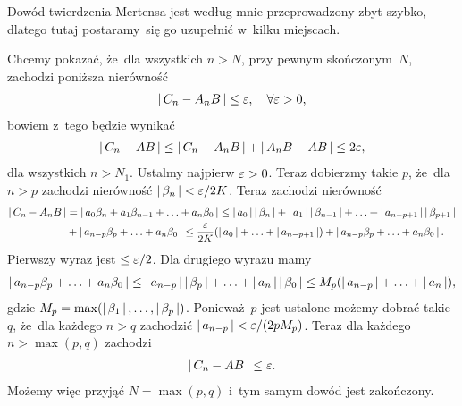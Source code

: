 \documentclass[a4paper,11pt]{article}
\begin{document}
\vspace{\spaceFour}


\start {} Dowód twierdzenia Mertensa jest według mnie
przeprowadzony zbyt szybko, dlatego tutaj postaramy~się go uzupełnić
w~kilku miejscach.

Chcemy pokazać, że~dla wszystkich $n > N$, przy pewnym skończonym~$N$,
zachodzi poniższa nierówność
\begin{equation}
  \label{eq:Leja-9}
  \begin{split}
    \left| \,  C_{ n } - A_{ n } B  \, \right| \leq \varepsilon, \quad \forall \varepsilon > 0,
  \end{split}
\end{equation}
bowiem z~tego będzie wynikać
\begin{equation}
  \label{eq:Leja-10}
  \begin{split}
    \left| \,  C_{ n } - AB  \, \right| \leq \left| \,  C_{ n } - A_{ n } B  \, \right| + \left| \, 
      A_{ n } B - AB  \, \right| \leq 2\varepsilon,
  \end{split}
\end{equation}
dla wszystkich $n > N_{ 1 }$. Ustalmy najpierw $\varepsilon > 0$. Teraz
dobierzmy takie $p$, że~dla $n > p$ zachodzi nierówność
$\left| \,  \beta_{ n }  \, \right| < \varepsilon / 2K$. Teraz zachodzi nierówność
\begin{equation}
  \label{eq:Leja-11}
  \begin{split}
    \left| \,  C_{ n } - A_{ n } B  \, \right| &= \left| \,  a_{ 0 } \beta_{ n } + a_{ 1 }
      \beta_{ n - 1 } + \ldots + a_{ n } \beta_{ 0 }  \, \right| \leq \left| \,  a_{ 0 }  \, \right|
    \left| \,  \beta_{ n }  \, \right| + \left| \,  a_{ 1 }  \, \right| \left| \,  \beta_{ n - 1 }  \, \right| + \ldots
    + \left| \,  a_{ n - p + 1 }  \, \right|
    \left| \,  \beta_{ p + 1 }  \, \right| \\
    &+ \left| \,  a_{ n - p } \beta_{ p } + \ldots + a_{ n } \beta_{ 0 }  \, \right| \leq
    \frac{ \varepsilon }{ 2K } ( \left| \,  a_{ 0 }  \, \right| + \ldots + \left| \,  a_{ n - p + 1
      }  \, \right| ) + \left| \,  a_{ n - p } \beta_{ p } + \ldots + a_{ n } \beta_{ 0 }
     \, \right|.
  \end{split}
\end{equation}
Pierwszy wyraz jest $\leq \varepsilon / 2$. Dla drugiego wyrazu mamy
\begin{equation}
  \label{eq:Leja-12}
  \begin{split}
    \left| \,  a_{ n - p } \beta_{ p } + \ldots + a_{ n } \beta_{ 0 }  \, \right| \leq
    \left| \,  a_{ n - p }  \, \right| \left| \,  \beta_{ p }  \, \right| + \ldots + \left| \,  a_{ n }  \, \right|
    \left| \,  \beta_{ 0 }  \, \right| \leq M_{ p } ( \left| \,  a_{ n - p }  \, \right| + \ldots +
    \left| \,  a_{ n }  \, \right| ),
  \end{split}
\end{equation}
gdzie $M_{ p } = \max( \left| \,  \beta_{ 1 }  \, \right|, \ldots, \left| \,  \beta_{ p }  \, \right| )$.
Ponieważ~$p$ jest ustalone możemy dobrać takie $q$, że~dla każdego
$n > q$ zachodzić $\left| \,  a_{ n - p }  \, \right| < \varepsilon / ( 2 p M_{ p } )$.
Teraz dla każdego $n > \max( p, q )$ zachodzi
\begin{equation}
  \label{eq:Leja-13}
  \begin{split}
    \left| \,  C_{ n } - AB  \, \right| \leq \varepsilon.
  \end{split}
\end{equation}
Możemy więc przyjąć $N = \max( p, q )$ i~tym samym dowód jest
zakończony.
\end{document}
